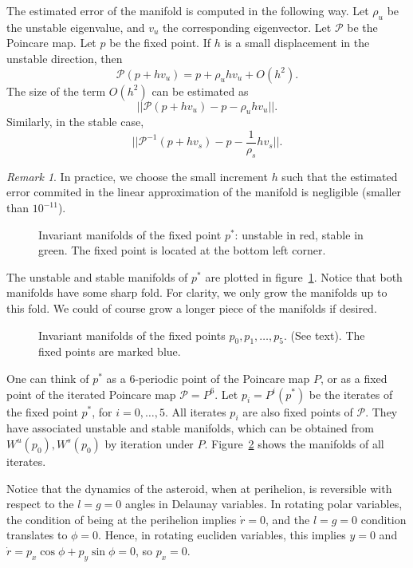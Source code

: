 \documentclass[a4paper]{amsart}
\theoremstyle{remark}
\newtheorem{rem}[thm]{Remark}
\newcommand{\sixmap}{\mathcal{P}}
\begin{document}
The estimated error of the manifold is computed in the following way. Let
$\rho_u$ be the unstable eigenvalue, and $v_u$ the corresponding
eigenvector. Let $\sixmap$ be the Poincare map. Let $p$ be the fixed
point. If $h$ is a small displacement in the unstable direction, then 
\[ \sixmap(p+hv_u) = p+\rho_uhv_u + O(h^2). \]
The size of the term $O(h^2)$ can be estimated as
\[ ||\sixmap(p+hv_u)-p-\rho_uhv_u||. \]
Similarly, in the stable case,
\[ ||\sixmap^{-1}(p+hv_s)-p-\frac{1}{\rho_s}hv_s||. \]

\begin{rem}
In practice, we choose the small increment $h$ such that the estimated
error commited in the linear approximation of the manifold is
negligible (smaller than $10^{-11}$).
\end{rem}
 
\begin{figure}
\caption{Invariant manifolds of the fixed point $p^*$: unstable in
red, stable in green. The fixed point is located at the bottom left
corner.}
\label{fig:invmfld}
\end{figure}

The unstable and stable manifolds of $p^*$ are plotted in
figure~\ref{fig:invmfld}. 
Notice that both manifolds have some sharp fold.
For clarity, we only grow the manifolds up to this fold.
We could of course grow a longer piece of the manifolds if desired.

\begin{figure}
\caption{Invariant manifolds of the fixed points $p_0, p_1,\dots,p_5$.
(See text).
The fixed points are marked blue.}
\label{fig:invmfld_it}
\end{figure}

One can think of $p^*$ as a $6$-periodic point of the Poincare map
$P$, or as a fixed point of the iterated Poincare map $\sixmap=P^6$. 
Let $p_i=P^i(p^*)$ be the iterates of the fixed point $p^*$, for
$i=0,\dots,5$.
All iterates $p_i$ are also fixed points of $\sixmap$.
They have associated unstable and stable manifolds, which can be
obtained from $W^u(p_0), W^s(p_0)$ by iteration under $P$.
Figure~\ref{fig:invmfld_it} shows the manifolds of all iterates.

Notice that the dynamics of the asteroid, when at perihelion, is
reversible with respect to the $l=g=0$ angles in Delaunay variables. 
In rotating polar variables, the condition of being at the perihelion
implies $\dot r = 0$, and the $l=g=0$ condition translates to
$\phi=0$. 
Hence, in rotating eucliden variables, this implies $y=0$ and $\dot r
= p_x \cos \phi + p_y \sin \phi = 0$, so $p_x=0$.
\end{document}
